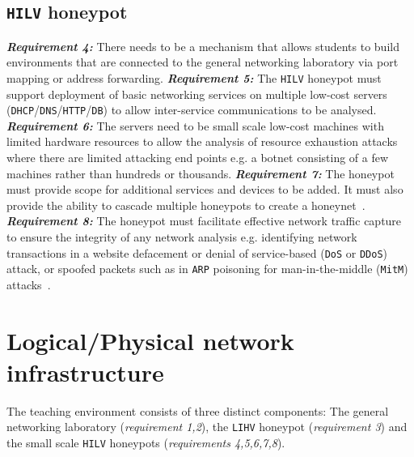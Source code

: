 \subsection{\texttt{HILV} honeypot}\label{subsec:ResearchHoneypot}
\noindent \emph{\textbf{Requirement 4:}} There needs to be a mechanism that allows students to build environments that are connected to the general networking laboratory via port mapping or address forwarding. 
\newline\newline
\noindent \emph{\textbf{Requirement 5:}} The \texttt{HILV} honeypot must support deployment of basic networking services on multiple low-cost servers (\texttt{DHCP}/\texttt{DNS}/\texttt{HTTP}/\texttt{DB}) to allow inter-service communications to be analysed. 
\newline\newline
\noindent \emph{\textbf{Requirement 6:}} The servers need to be small scale low-cost machines with limited hardware resources to allow the analysis of resource exhaustion attacks where there are limited attacking end points e.g. a botnet consisting of a few machines rather than hundreds or thousands. 
\newline\newline
\noindent \emph{\textbf{Requirement 7:}} The honeypot must provide scope for additional services and devices to be added. It must also provide the ability to cascade multiple honeypots to create a honeynet~\cite{AA:15,FDF:15,KNC:15}.
\newline\newline
\noindent \emph{\textbf{Requirement 8:}} The honeypot must facilitate effective network traffic capture to ensure the integrity of any network analysis e.g. identifying network transactions in a website defacement or denial of service-based (\texttt{DoS} or \texttt{DDoS}) attack, or spoofed packets such as in \texttt{ARP} poisoning for man-in-the-middle (\texttt{MitM}) attacks~\cite{PS:16,RSKA:16}.  

\section{Logical/Physical network infrastructure}\label{LogicalDesign}

The teaching environment consists of three distinct components: The general networking laboratory (\textit{requirement 1,2}), the \texttt{LIHV} honeypot (\textit{requirement 3}) and the small scale \texttt{HILV} honeypots (\textit{requirements 4,5,6,7,8}). 

